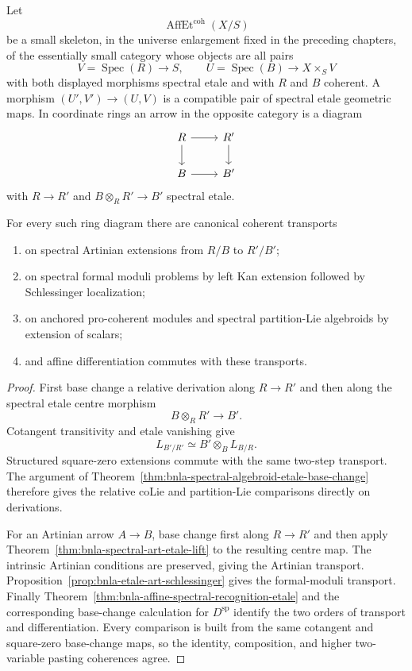 \begin{definition}
\label{def:bnla-affine-etale-pairs}
Let
\[
    \operatorname{AffEt}^{\mathrm{coh}}(X/S)
\]
be a small skeleton, in the universe enlargement fixed in the preceding
chapters, of the essentially small category whose objects are all pairs
\[
    V=\operatorname{Spec}(R)\longrightarrow S,
    \qquad
    U=\operatorname{Spec}(B)\longrightarrow X\times_SV
\]
with both displayed morphisms spectral etale and with $R$ and $B$ coherent.
A morphism $(U',V')\to(U,V)$ is a compatible pair of spectral etale geometric
maps.  In coordinate rings an arrow in the opposite category is a diagram
\[
\begin{tikzcd}
R \arrow[r] \arrow[d] & R' \arrow[d]\\
B \arrow[r] & B'
\end{tikzcd}
\]
with $R\to R'$ and $B\otimes_RR'\to B'$ spectral etale.
\end{definition}

\begin{theorem}
\label{thm:bnla-two-variable-etale-base-change}
For every such ring diagram there are canonical coherent transports
\begin{enumerate}
    \item on spectral Artinian extensions from $R/B$ to $R'/B'$;
    \item on spectral formal moduli problems by left Kan extension followed by
    Schlessinger localization;
    \item on anchored pro-coherent modules and spectral partition-Lie
    algebroids by extension of scalars;
    \item and affine differentiation commutes with these transports.
\end{enumerate}
\end{theorem}

\begin{proof}
First base change a relative derivation along $R\to R'$ and then along the
spectral etale centre morphism
\[
    B\otimes_RR'\longrightarrow B'.
\]
Cotangent transitivity and etale vanishing give
\[
\boxed{
    L_{B'/R'}
    \simeq
    B'\otimes_BL_{B/R}.}
\]
Structured square-zero extensions commute with the same two-step transport.
The argument of
Theorem~\ref{thm:bnla-spectral-algebroid-etale-base-change} therefore gives
the relative coLie and partition-Lie comparisons directly on derivations.

For an Artinian arrow $A\to B$, base change first along $R\to R'$ and then
apply Theorem~\ref{thm:bnla-spectral-art-etale-lift} to the resulting centre
map.  The intrinsic Artinian conditions are preserved, giving the Artinian
transport.  Proposition~\ref{prop:bnla-etale-art-schlessinger} gives the
formal-moduli transport.  Finally
Theorem~\ref{thm:bnla-affine-spectral-recognition-etale} and the corresponding
base-change calculation for $D^{\mathrm{sp}}$ identify the two orders of
transport and differentiation.  Every comparison is built from the same
cotangent and square-zero base-change maps, so the identity, composition, and
higher two-variable pasting coherences agree.
\end{proof}

